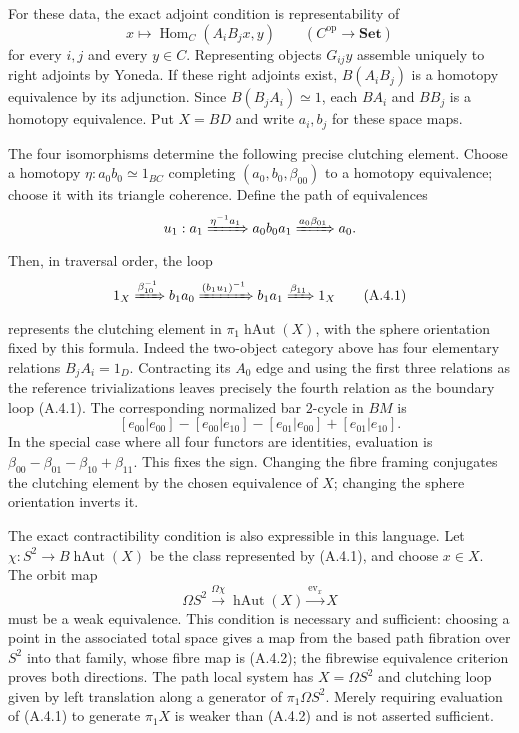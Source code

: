 For these data, the exact adjoint condition is representability of
\[
 x\longmapsto\operatorname{Hom}_C(A_iB_jx,y)\qquad(C^{\mathrm{op}}\to\mathbf{Set})
\]
for every $i,j$ and every $y\in C$. Representing objects $G_{ij}y$ assemble uniquely to right adjoints by Yoneda. If these right adjoints exist, $B(A_iB_j)$ is a homotopy equivalence by its adjunction. Since $B(B_jA_i)\simeq1$, each $BA_i$ and $BB_j$ is a homotopy equivalence. Put $X=BD$ and write $a_i,b_j$ for these space maps.

The four isomorphisms determine the following precise clutching element. Choose a homotopy $\eta:a_0b_0\simeq1_{BC}$ completing $(a_0,b_0,\beta_{00})$ to a homotopy equivalence; choose it with its triangle coherence. Define the path of equivalences
\[
 u_1:a_1\xRightarrow{\eta^{-1}a_1}a_0b_0a_1
                \xRightarrow{a_0\beta_{01}}a_0.
\]
Then, in traversal order, the loop
\[
 1_X\xRightarrow{\beta_{10}^{-1}}b_1a_0
 \xRightarrow{(b_1u_1)^{-1}}b_1a_1
 \xRightarrow{\beta_{11}}1_X                                      \tag{A.4.1}
\]
represents the clutching element in $\pi_1\operatorname{hAut}(X)$, with the sphere orientation fixed by this formula. Indeed the two-object category above has four elementary relations $B_jA_i=1_D$. Contracting its $A_0$ edge and using the first three relations as the reference trivializations leaves precisely the fourth relation as the boundary loop (A.4.1). The corresponding normalized bar $2$-cycle in $BM$ is
\[
 [e_{00}|e_{00}]-[e_{00}|e_{10}]-[e_{01}|e_{00}]+[e_{01}|e_{10}].
\]
In the special case where all four functors are identities, evaluation is $\beta_{00}-\beta_{01}-\beta_{10}+\beta_{11}$. This fixes the sign. Changing the fibre framing conjugates the clutching element by the chosen equivalence of $X$; changing the sphere orientation inverts it.

The exact contractibility condition is also expressible in this language. Let $\chi:S^2\to B\operatorname{hAut}(X)$ be the class represented by (A.4.1), and choose $x\in X$. The orbit map
\[
 \Omega S^2\xrightarrow{\Omega\chi}\operatorname{hAut}(X)
                  \xrightarrow{\operatorname{ev}_x}X             \tag{A.4.2}
\]
must be a weak equivalence. This condition is necessary and sufficient: choosing a point in the associated total space gives a map from the based path fibration over $S^2$ into that family, whose fibre map is (A.4.2); the fibrewise equivalence criterion proves both directions. The path local system has $X=\Omega S^2$ and clutching loop given by left translation along a generator of $\pi_1\Omega S^2$. Merely requiring evaluation of (A.4.1) to generate $\pi_1X$ is weaker than (A.4.2) and is not asserted sufficient.

